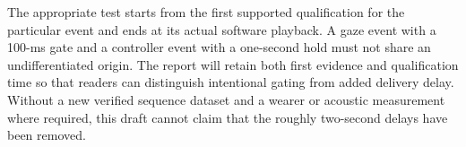 The appropriate test starts from the first supported qualification for the particular event and ends at its actual software playback. A gaze event with a 100-ms gate and a controller event with a one-second hold must not share an undifferentiated origin. The report will retain both first evidence and qualification time so that readers can distinguish intentional gating from added delivery delay. Without a new verified sequence dataset and a wearer or acoustic measurement where required, this draft cannot claim that the roughly two-second delays have been removed.
